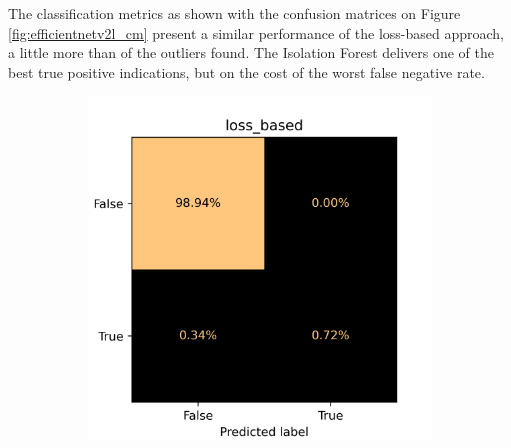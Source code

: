 The classification metrics as shown with the confusion matrices on Figure \ref{fig:efficientnetv2l_cm}
present a similar performance of the loss-based approach,
a little more than \small {} of the outliers found.
The Isolation Forest delivers one of the best true positive indications,
but on the cost of the worst false negative rate.

\begin{figure}[!ht]
    \centering
    \begin{subfigure}{0.4\textwidth}
        \centering
        \includegraphics[width=\textwidth]{./results/efficientnetv2l_vgg19/20230525_194238_loss_based_cm.png}
    \end{subfigure}
    \begin{subfigure}{0.4\textwidth}
        \centering

\end{subfigure}
\end{figure}
